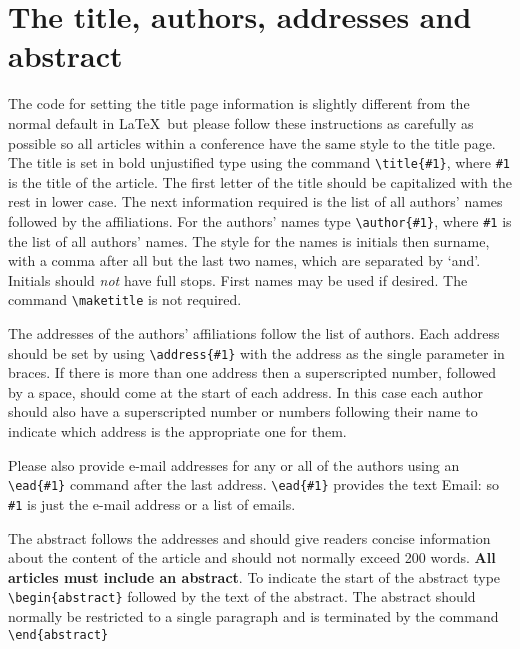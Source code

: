 \documentclass[a4paper]{jpconf}
\begin{document}
\section{The title, authors, addresses and abstract} 
The code for setting the title page information is slightly different from
the normal default in \LaTeX\ but please follow these instructions as carefully as possible so all articles within a conference have the same style to the title page. 
The title is set in bold unjustified type using the command
\verb"\title{#1}", where \verb"#1" is the title of the article. The
first letter of the title should be capitalized with the rest in lower case. 
The next information required is the list of all authors' names followed by 
the affiliations. For the authors' names type \verb"\author{#1}", 
where \verb"#1" is the 
list of all authors' names. The style for the names is initials then
surname, with a comma after all but the last 
two names, which are separated by `and'. Initials should {\it not} have 
full stops. First names may be used if desired. The command \verb"\maketitle" is not
required.

The addresses of the authors' affiliations follow the list of authors. 
Each address should be set by using
\verb"\address{#1}" with the address as the single parameter in braces. 
If there is more 
than one address then a superscripted number, followed by a space, should come at the start of
each address. In this case each author should also have a superscripted number or numbers following their name to indicate which address is the appropriate one for them.
 
Please also provide e-mail addresses for any or all of the authors using an \verb"\ead{#1}" command after the last address. \verb"\ead{#1}" provides the text Email: so \verb"#1" is just the e-mail address or a list of emails.  

The abstract follows the addresses and
should give readers concise information about the content 
of the article and should not normally exceed 200 
words. {\bf All articles must include an abstract}. To indicate the start 
of the abstract type \verb"\begin{abstract}" followed by the text of the 
abstract.  The abstract should normally be restricted 
to a single paragraph and is terminated by the command
\verb"\end{abstract}"
\end{document}
